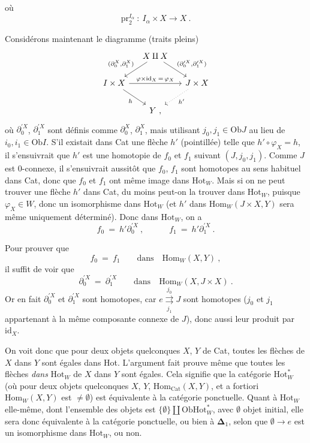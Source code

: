 \documentclass[11pt]{article}
\newcommand{\printedpage}[1]{\marginpar{\footnotesize p.~#1}}
\newcommand{\msp}[1]{\marginpar{\footnotesize [#1]}}
\newcommand{\Hot}{\mathrm{Hot}}
\newcommand{\Hom}{\mathrm{Hom}}
\newcommand{\Cat}{\mathrm{Cat}}
\newcommand{\Ob}{\mathrm{Ob}}
\newcommand{\pr}{\mathrm{pr}}
\newcommand{\id}{\mathrm{id}}
\begin{document}
\printedpage{69}
où
\[
\pr_2^{I_\alpha}\ :\ I_\alpha\times X \longrightarrow X\ .
\]

\msp{page 128}Considérons maintenant le diagramme (traits pleins)
\[
\begin{tikzcd}[column sep=small]
& X\amalg X \arrow[dl, "{(\partial_0^X,\partial_1^X)}"'] \arrow[dr, "{(\partial_0^{\prime X},\partial_1^{\prime X})}"] & \\
I\times X \arrow[rr, "\varphi\times\id_X\,=\,\varphi_X"] \arrow[dr, "h"'] & & J\times X \arrow[dl, dotted, "h'"] \\
& Y\ , &
\end{tikzcd}
\]
où $\partial_0^{\prime X}$, $\partial_1^{\prime X}$ sont définis comme $\partial_0^X$, $\partial_1^X$, mais utilisant $j_0,j_1\in\Ob J$ au lieu de $i_0,i_1\in\Ob I$. S'il existait dans Cat une flèche $h'$ (pointillée) telle que $h'\circ\varphi_X=h$, il s'ensuivrait que $h'$ est une homotopie de $f_0$ et $f_1$ suivant $(J,j_0,j_1)$. Comme $J$ est 0-connexe, il s'ensuivrait aussitôt que $f_0$, $f_1$ sont homotopes au sens habituel dans Cat, donc que $f_0$ et $f_1$ ont même image dans $\Hot_W$. Mais si on ne peut trouver une flèche $h'$ dans Cat, du moins peut-on la trouver dans $\Hot_W$, puisque $\varphi_X\in W$, donc un isomorphisme dans $\Hot_W$ (et $h'$ dans $\Hom_W(J\times X,Y)$ sera même uniquement déterminé). Donc dans $\Hot_W$, on a
\[
f_0\ =\ h'\partial_0^{\prime X}\ ,\qquad\quad f_1\ =\ h'\partial_1^{\prime X}\ .
\]

\msp{page 129}Pour prouver que
\[
f_0\ =\ f_1\qquad\text{dans}\quad\Hom_W(X,Y)\ ,
\]
il suffit de voir que
\[
\partial_0^{\prime X}\ =\ \partial_1^{\prime X}\qquad\text{dans}\quad\Hom_W(X,J\times X)\ .
\]
Or en fait $\partial_0^{\prime X}$ et $\partial_1^{\prime X}$ sont homotopes, car $e\underset{j_1}{\overset{j_0}{\rightrightarrows}}J$ sont homotopes ($j_0$ et $j_1$ appartenant à la même composante connexe de $J$), donc aussi leur produit par $\id_X$.

On voit donc que pour deux objets quelconques $X$, $Y$ de Cat, toutes les flèches de $X$ dans $Y$ sont égales dans Hot. L'argument fait prouve même que toutes les flèches \textit{dans} $\Hot_W$ de $X$ dans $Y$ sont égales. Cela signifie que la catégorie $\Hot_W^*$ (où pour deux objets quelconques $X$, $Y$, $\Hom_{\Cat}(X,Y)$, et a fortiori $\Hom_W(X,Y)$ est $\neq\emptyset$) est équivalente à la catégorie ponctuelle. Quant à $\Hot_W$ elle-même, dont l'ensemble des objets est $\{\emptyset\}\amalg\Ob\Hot_W^*$, avec $\emptyset$ objet initial, elle sera donc équivalente à la catégorie ponctuelle, ou bien à $\boldsymbol{\Delta}_1$, selon que $\emptyset\longrightarrow e$ est un isomorphisme dans $\Hot_W$, ou non.
\end{document}
